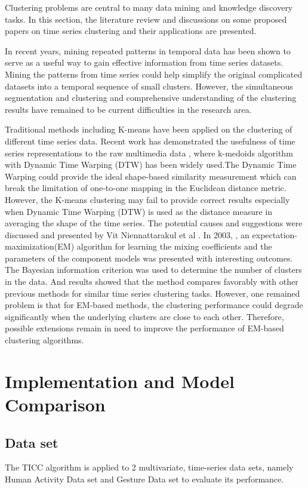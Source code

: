 \documentclass{llncs}
\begin{document}
Clustering problems are central to many data mining and knowledge discovery tasks. In this section, the literature review and discussions on some proposed papers on time series clustering and their applications are presented. 

In recent years, mining repeated patterns in temporal data has been shown to serve as a useful way to gain effective information from time series datasets. Mining the patterns from time series could help simplify the original complicated datasets into a temporal sequence of small clusters. However, the simultaneous segmentation and clustering and comprehensive understanding of the clustering results have remained to be current difficulties in the research area.

Traditional methods including K-means have been applied on the clustering of different time series data. Recent work has demonstrated the usefulness of time series representations to the raw multimedia data \cite{DBLP:conf/mue/NiennattrakulR07}, where k-medoids algorithm with Dynamic Time Warping (DTW) has been widely used.The Dynamic Time Warping could provide the ideal shape-based similarity measurement which can break the limitation of one-to-one mapping in the Euclidean distance metric. However, the K-means clustering may fail to provide correct results especially when Dynamic Time Warping (DTW) is used as the distance measure in averaging the shape of the time series. The potential causes and suggestions were discussed and presented by Vit Niennattarakul et al \cite{DBLP:conf/mue/NiennattrakulR07}. In 2003, \cite{xiong2004time}, an expectation-maximization(EM) algorithm for learning the mixing coefficients and the parameters of the component models was presented with interesting outcomes. The Bayesian information criterion was used to determine the number of clusters in the data. And results showed that the method compares favorably with other previous methods for similar time series clustering tasks. However, one remained problem is that for EM-based methods, the clustering performance could degrade significantly when the underlying clusters are close to each other. Therefore, possible extensions remain in need to improve the performance of EM-based clustering algorithms. 

\section{Implementation and Model Comparison}
\subsection{Data set}
The TICC algorithm is applied to 2 multivariate, time-series data sets, namely Human Activity Data set \cite{Stisen:2015:SDD:2809695.2809718} and Gesture Data set \cite{Madeo:2013:GUS:2480362.2480373} to evaluate its performance. 
\end{document}
